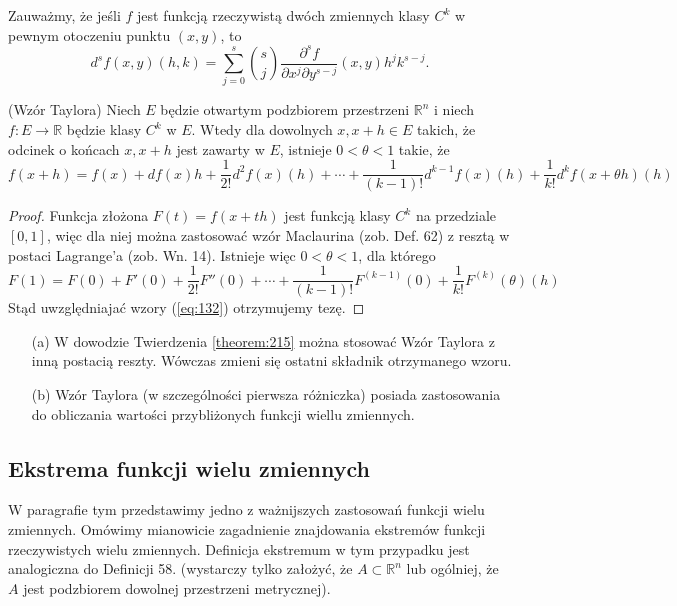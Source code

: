 \documentclass[leqno]{article}
\begin{document}
\begin{justify}
\begin{uwaga}
    Zauważmy, że jeśli $f$ jest funkcją rzeczywistą dwóch zmiennych klasy $C^k$ w pewnym otoczeniu punktu $(x,y)$, to 
    \[
        d^s f(x,y)(h,k)=\sum_{j=0}^{s}\binom{s}{j}\frac{\partial ^s f}{\partial x^j \partial y^{s-j}}(x,y)h^j k^{s-j}.
    \]
\end{uwaga}

\begin{theorem}
{
    (Wzór Taylora) Niech $E$ będzie otwartym podzbiorem przestrzeni $\mathbb{R}^n$ i niech $f : E \to \mathbb{R}$ będzie klasy $C^k$ w $E$. 
    Wtedy dla dowolnych $x, x+h \in E$ takich, że odcinek o końcach $x, x+h$ jest zawarty w $E$, istnieje $0 < \theta < 1$ takie, że 
    \[
        f(x+h) = f(x) + df(x)h + \frac{1}{2!}d^2 f(x)(h) + \cdots + \frac{1}{(k-1)!}d^{k-1}f(x)(h) + \frac{1}{k!} d^k f(x + \theta h)(h)
    \]
}
\end{theorem}

\begin{proof}
    Funkcja złożona $F(t) = f(x+th)$ jest funkcją klasy $C^k$ na przedziale $[0,1]$, więc dla niej można zastosować wzór Maclaurina (zob. Def. 62) z resztą w postaci Lagrange'a
    (zob. Wn. 14). Istnieje więc $0 < \theta < 1$, dla którego 
    \[
        F(1) = F(0) + F'(0) + \frac{1}{2!}F''(0) + \cdots + \frac{1}{(k-1)!}F^{(k-1)}(0) + \frac{1}{k!}F^(k)(\theta)(h)
    \]
    Stąd uwzględniajać wzory (\ref{eq:132}) otrzymujemy tezę.
\end{proof}

\begin{uwaga}
    \begin{itemize}
        \item [(a)] W dowodzie Twierdzenia \ref{theorem:215} można stosować Wzór Taylora z inną postacią reszty. Wówczas zmieni się ostatni składnik otrzymanego wzoru.
        \item [(b)] Wzór Taylora (w szczególności pierwsza różniczka) posiada zastosowania do obliczania wartości przybliżonych funkcji wiellu zmiennych.
    \end{itemize}
\end{uwaga}

\subsection{Ekstrema funkcji wielu zmiennych}

W paragrafie tym przedstawimy jedno z ważnijszych zastosowań funkcji wielu zmiennych. Omówimy mianowicie zagadnienie znajdowania ekstremów funkcji rzeczywistych wielu zmiennych.
Definicja ekstremum w tym przypadku jest analogiczna do Definicji 58. (wystarczy tylko założyć, że $A \subset \mathbb{R}^n$ lub ogólniej, że $A$ jest podzbiorem dowolnej przestrzeni metrycznej).


\end{justify}
\end{document}
